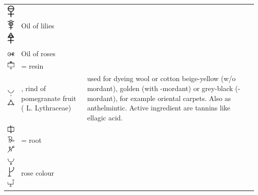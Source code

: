 \documentclass[british,final,landscape]{scrartcl}
\begin{document}
\begin{refsection}
\begin{supertabular}{p{0.3\textwidth}p{0.34\textwidth}p{0.34\textwidth}}
   \includegraphics[width=5mm]{Plant/OilOfLilies} \includegraphics[width=5mm]{Plant/OilOfLilies2} \includegraphics[width=5mm]{Plant/OilOfLilies3} & Oil of lilies & \\
   \includegraphics[width=5mm]{Plant/OilOfRoses} & Oil of roses & \\
   \includegraphics[width=5mm]{Plant/Resina} &  = resin & \\
   \includegraphics[width=5mm]{Plant/Pomegranate} \includegraphics[width=5mm]{Plant/Pomegranate2} & , rind of pomegranate fruit ( L. Lythraceae) & used for dyeing wool or cotton \parencite{Bac-96} beige-yellow (w/o mordant), golden (with -mordant) or grey-black (-mordant), for example oriental carpets. Also as anthelmintic. Active ingredient are tannins like ellagic acid.  \\
   \includegraphics[width=5mm]{Plant/Root} \includegraphics[width=5mm]{Plant/Root2} \includegraphics[width=5mm]{Plant/Root3} &  = root & \\
   \includegraphics[width=5mm]{Plant/RoseColour} \includegraphics[height=5mm]{Plant/RoseColour2} \includegraphics[width=5mm]{Plant/RoseColour3} & rose colour & \\

\end{supertabular}
\end{refsection}
\end{document}
